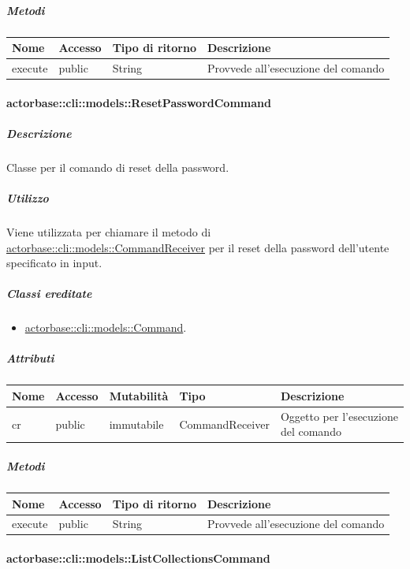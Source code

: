 \documentclass{scalatekids-article}
\begin{document}
\subparagraph{Metodi}

\begin{tabular}{| l | l | l | l |}
  \hline
  Nome & Accesso & Tipo di ritorno & Descrizione\\
  \hline
  execute & public & String & Provvede all'esecuzione del comando\\
  \hline
\end{tabular}

\paragraph{actorbase::cli::models::ResetPasswordCommand}
\label{sec:actorbase::cli::models::ResetPasswordCommand}

\subparagraph{Descrizione}

Classe per il comando di reset della password.

\subparagraph{Utilizzo}

Viene utilizzata per chiamare il metodo di
\hyperref[sec:actorbase::cli::models::CommandReceiver]{actorbase::cli::models::CommandReceiver} per il reset della password
dell'utente specificato in input.

\subparagraph{Classi ereditate}

\begin{itemize}
\item \hyperref[sec:actorbase::cli::models::Command]{actorbase::cli::models::Command}.
\end{itemize}

\subparagraph{Attributi}

\begin{tabular}{| p{1cm} | p{1.5cm} | p{2cm} | p{4cm} | p{8.5cm} |}
  \hline
  Nome & Accesso & Mutabilità & Tipo & Descrizione\\
  \hline
  cr & public & immutabile & CommandReceiver & Oggetto per l'esecuzione del comando\\
  \hline
\end{tabular}

\subparagraph{Metodi}

\begin{tabular}{| l | l | l | l |}
  \hline
  Nome & Accesso & Tipo di ritorno & Descrizione\\
  \hline
  execute & public & String & Provvede all'esecuzione del comando\\
  \hline
\end{tabular}

\paragraph{actorbase::cli::models::ListCollectionsCommand}
\label{sec:actorbase::cli::models::ListCollectionsCommand}
\end{document}
